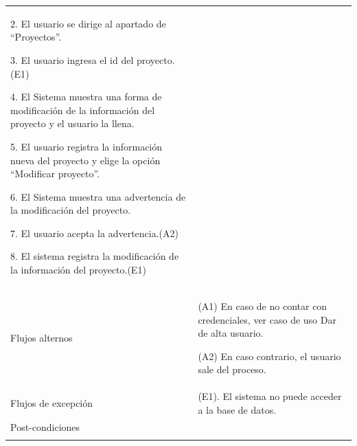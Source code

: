 \begin{longtable}{@{\extracolsep{8pt}}l p{8.5cm}}
 2. El usuario se dirige al apartado de “Proyectos”. \par\vspace{.1cm}

 3. El usuario ingresa el id del proyecto.(E1) \par\vspace{.1cm}

 4. El Sistema muestra una forma de modificación de la información del proyecto y el usuario la llena. \par\vspace{.1cm}

 5. El usuario registra la información nueva del proyecto y elige la opción “Modificar proyecto”. \par\vspace{.1cm}

 6. El Sistema muestra una advertencia de la modificación del proyecto. \par\vspace{.1cm}

 7. El usuario acepta la advertencia.(A2) \par\vspace{.1cm}

 8. El sistema registra la modificación de la información del proyecto.(E1) \par\vspace{.1cm}

\\

\hspace{.2cm}Flujos alternos & 
\par (A1) En caso de no contar con credenciales, ver caso de uso Dar de alta usuario.

\par (A2) En caso contrario, el usuario sale del proceso.



\\

\hspace{.2cm}Flujos de excepción & 
\par\vspace{.1cm} (E1). El sistema no puede acceder a la base de datos. 


\\%

\hspace{.2cm}Post-condiciones & 
\\
\hline

 \\
\end{longtable}
\endgroup



